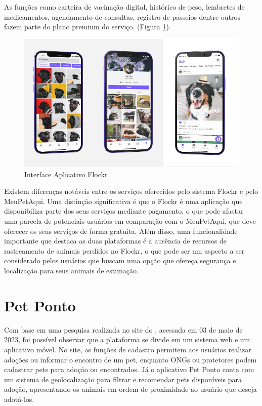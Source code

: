 As funções como carteira de vacinação digital, histórico de peso, lembretes de medicamentos, agendamento de consultas, registro de passeios dentre outros fazem parte do plano premium do serviço. (Figura \ref{fig:Flockr}).


\begin{figure}[htb]
     \centering
     \includegraphics[width=14cm]{arquivos/Figuras/florckr.jpg}
     \caption{Interface Aplicativo Flockr}
     \label{fig:Flockr}
\end{figure}

Existem diferenças notáveis entre os serviços oferecidos pelo sistema Flockr e pelo MeuPetAqui. Uma distinção significativa é que o Flockr é uma aplicação que disponibiliza parte dos seus serviços mediante pagamento, o que pode afastar uma parcela de potenciais usuários em comparação com o MeuPetAqui, que deve oferecer os seus serviços de forma gratuita. Além disso, uma funcionalidade importante que destaca as duas plataformas é a ausência de recursos de rastreamento de animais perdidos no Flockr, o que pode ser um aspecto a ser considerado pelos usuários que buscam uma opção que ofereça segurança e localização para seus animais de estimação.
\newpage


\section{Pet Ponto}
Com base em uma pesquisa realizada no site do , acessada em 03 de maio de 2023, foi possível observar que a plataforma se divide em um sistema web e um aplicativo móvel. No site, as funções de cadastro permitem aos usuários realizar adoções ou informar o encontro de um pet, enquanto ONGs ou protetores podem cadastrar pets para adoção ou encontrados. Já o aplicativo Pet Ponto conta com um sistema de geolocalização para filtrar e recomendar pets disponíveis para adoção, apresentando os animais em ordem de proximidade ao usuário que deseja adotá-los.

